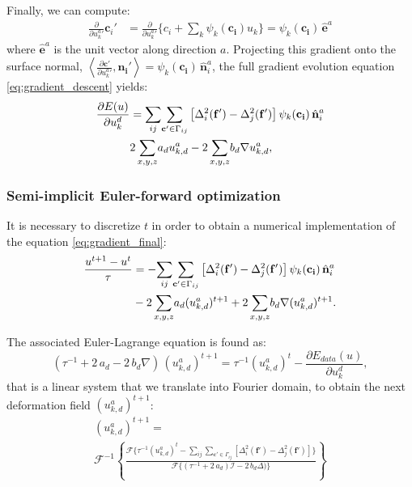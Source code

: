 Finally, we can compute:
\begin{align}
\frac{\partial}{\partial {u^a_k}'}{\mathbf{c}_i}' &= \frac{\partial}{\partial {u^a_k}'} 
\lbrace c_i + \sum_k \psi_k(\mathbf{c_i}) u_k \rbrace
= \psi_k(\mathbf{c_i})\, \hat{\mathbf{e}}^a
\end{align}
where $\hat{\mathbf{e}}^a$ is the unit vector along direction $a$. Projecting
this gradient onto the surface normal,
$\left\langle \frac{\partial \mathbf{c}'}{\partial {u^a_k}'}, \mathbf{n_i}'\right\rangle
= \psi_k(\mathbf{c_i})\, \hat{\mathbf{n}}_i^a$, the
full gradient evolution equation \eqref{eq:gradient_descent} yields:
\begin{align}
\frac{\partial E(u)}{\partial u^d_k} 
&= \underset{ij}{\sum} \underset{\mathbf{c}' \in \Gamma_{ij}}{\sum}
\left[ \Delta^2_i (\mathbf{f}' ) - \Delta^2_j (\mathbf{f}')\right]
\psi_k(\mathbf{c_i})\, \hat{\mathbf{n}}_i^a \notag\\
&2\, \underset{x,y,z}{\sum} a_d u^a_{k,d}
-2\, \underset{x,y,z}{\sum} b_d \nabla u^a_{k,d},
\label{eq:gradient_final}
\end{align}

\subsubsection{Semi-implicit Euler-forward optimization}
It is necessary to discretize $t$ in order to obtain a numerical
implementation of the equation \eqref{eq:gradient_final}:
\begin{align}
\frac{u^{t+1}-u^{t}}{\tau} 
&= - \underset{ij}{\sum} \underset{\mathbf{c}' \in \Gamma_{ij}}{\sum}
\left[ \Delta^2_i (\mathbf{f}' ) - \Delta^2_j (\mathbf{f}')\right]
\psi_k(\mathbf{c_i})\, \hat{\mathbf{n}}_i^a \notag\\
&-2\, \underset{x,y,z}{\sum} a_d (u^a_{k,d})^{t+1}
+2\, \underset{x,y,z}{\sum} b_d \nabla (u^a_{k,d})^{t+1}.
\end{align}

The associated Euler-Lagrange equation is found as:
\begin{equation}
(\tau^{-1} +2\, a_d - 2\, b_d \nabla )\,(u^a_{k,d})^{t+1} = 
\tau^{-1} (u^a_{k,d})^{t} - \frac{\partial E_{data}(u)}{\partial u^d_k},
\end{equation}
that is a linear system that we translate into Fourier domain,
to obtain the next deformation field $(u^a_{k,d})^{t+1}$:
\begin{multline}
(u^a_{k,d})^{t+1} = \\
 \mathcal{F}^{-1} \left\lbrace
\frac{\mathcal{F}\lbrace \tau^{-1} (u^a_{k,d})^{t} - \underset{ij}{\sum} \underset{\mathbf{c}' \in \Gamma_{ij}}{\sum}
\left[ \Delta^2_i (\mathbf{f}' ) - \Delta^2_j (\mathbf{f}')\right] \rbrace}
     {\mathcal{F}\lbrace (\tau^{-1} +2\,a_d)\mathcal{I} - 2\,b_d \Delta ) \rbrace}
     \right\rbrace
\end{multline}

